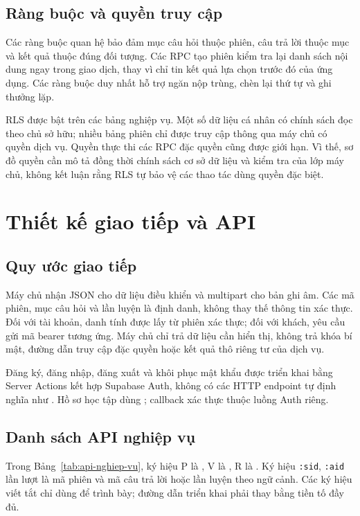 \documentclass[12pt,a4paper,oneside]{report}
\begin{document}
\subsection{Ràng buộc và quyền truy cập}

Các ràng buộc quan hệ bảo đảm mục câu hỏi thuộc phiên, câu trả lời thuộc mục và kết quả thuộc đúng đối tượng. Các RPC tạo phiên kiểm tra lại danh sách nội dung ngay trong giao dịch, thay vì chỉ tin kết quả lựa chọn trước đó của ứng dụng. Các ràng buộc duy nhất hỗ trợ ngăn nộp trùng, chèn lại thứ tự và ghi thưởng lặp.

RLS được bật trên các bảng nghiệp vụ. Một số dữ liệu cá nhân có chính sách đọc theo chủ sở hữu; nhiều bảng phiên chỉ được truy cập thông qua máy chủ có quyền dịch vụ. Quyền thực thi các RPC đặc quyền cũng được giới hạn. Vì thế, sơ đồ quyền cần mô tả đồng thời chính sách cơ sở dữ liệu và kiểm tra của lớp máy chủ, không kết luận rằng RLS tự bảo vệ các thao tác dùng quyền đặc biệt.

\section{Thiết kế giao tiếp và API}

\subsection{Quy ước giao tiếp}

Máy chủ nhận JSON cho dữ liệu điều khiển và multipart cho bản ghi âm. Các mã phiên, mục câu hỏi và lần luyện là định danh, không thay thế thông tin xác thực. Đối với tài khoản, danh tính được lấy từ phiên xác thực; đối với khách, yêu cầu gửi mã bearer tương ứng. Máy chủ chỉ trả dữ liệu cần hiển thị, không trả khóa bí mật, đường dẫn truy cập đặc quyền hoặc kết quả thô riêng tư của dịch vụ.

Đăng ký, đăng nhập, đăng xuất và khôi phục mật khẩu được triển khai bằng Server Actions kết hợp Supabase Auth, không có các HTTP endpoint tự định nghĩa như . Hồ sơ học tập dùng ; callback xác thực thuộc luồng Auth riêng.

\subsection{Danh sách API nghiệp vụ}

Trong Bảng~\ref{tab:api-nghiep-vu}, ký hiệu P là , V là , R là . Ký hiệu \texttt{:sid}, \texttt{:aid} lần lượt là mã phiên và mã câu trả lời hoặc lần luyện theo ngữ cảnh. Các ký hiệu viết tắt chỉ dùng để trình bày; đường dẫn triển khai phải thay bằng tiền tố đầy đủ.
\end{document}
